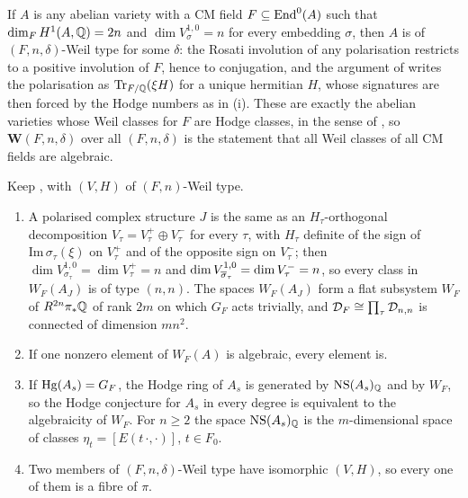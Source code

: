 \begin{remark}\label{rem:cmmember}
If $A$ is any abelian variety with a CM field $F\subseteq\operatorname{End}^{0}(A)$ such
that $\dim_{F}H^{1}(A,\mathbb{Q})=2n$ and $\dim V_{\sigma}^{1,0}=n$ for every
embedding $\sigma$, then $A$ is of $(F,n,\delta)$-Weil type for some
$\delta$: the Rosati involution of any polarisation restricts to a positive
involution of $F$, hence to conjugation, and the argument of
 writes the polarisation as $\operatorname{Tr}_{F/\mathbb{Q}}(\xi H)$ for a
unique hermitian $H$, whose signatures are then forced by the Hodge numbers
as in (i). These are exactly the abelian varieties whose
Weil classes for $F$ are Hodge classes, in the sense of \cite{MZ99}, so
$\mathbf{W}(F,n,\delta)$ over all $(F,n,\delta)$ is the statement that all
Weil classes of all CM fields are algebraic.
\end{remark}

\begin{proposition}\label{prop:cmweil}
Keep , with $(V,H)$ of $(F,n)$-Weil type.
\begin{enumerate}[label=\textup{(\roman*)},leftmargin=2.6em,itemsep=2pt]
\item A polarised complex structure $J$ is the same as an $H_{\tau}$-orthogonal
  decomposition $V_{\tau}=V_{\tau}^{+}\oplus V_{\tau}^{-}$ for every $\tau$,
  with $H_{\tau}$ definite of the sign of $\mathrm{Im}\,\sigma_{\tau}(\xi)$ on
  $V_{\tau}^{+}$ and of the opposite sign on $V_{\tau}^{-}$; then
  $\dim V^{1,0}_{\sigma_{\tau}}=\dim V_{\tau}^{+}=n$ and
  $\dim V^{1,0}_{\overline{\sigma}_{\tau}}=\dim V_{\tau}^{-}=n$, so every class in
  $W_{F}(A_{J})$ is of type $(n,n)$. The spaces $W_{F}(A_{J})$ form a flat
  subsystem $W_{F}$ of $R^{2n}\pi_{*}\mathbb{Q}$ of rank $2m$ on which $G_{F}$ acts
  trivially, and $\mathcal{D}_{F}\cong\prod_{\tau}\mathcal{D}_{n,n}$ is connected of
  dimension $mn^{2}$.
\item If one nonzero element of $W_{F}(A)$ is algebraic, every element is.
\item If $\operatorname{Hg}(A_{s})=G_{F}$, the Hodge ring of $A_{s}$ is generated by
  $\mathrm{NS}(A_{s})_{\mathbb{Q}}$ and by $W_{F}$, so the Hodge conjecture for $A_{s}$ in
  every degree is equivalent to the algebraicity of $W_{F}$. For $n\ge2$ the
  space $\mathrm{NS}(A_{s})_{\mathbb{Q}}$ is the $m$-dimensional space of classes
  $\eta_{t}=[E(t\,\cdot,\cdot)]$, $t\in F_{0}$.
\item Two members of $(F,n,\delta)$-Weil type have isomorphic $(V,H)$, so
  every one of them is a fibre of $\pi$.
\end{enumerate}
\end{proposition}

